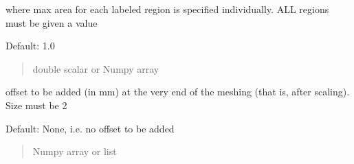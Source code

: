 \documentclass[letterpaper,10pt,english]{sphinxmanual}
\begin{document}
\begin{fulllineitems}
\begin{fulllineitems}
\begin{sphinxVerbatim}[commandchars=\\\{\}]
\PYG{p}{[} \PYG{p}{]}
\PYG{p}{[} \PYG{p}{]}
\end{sphinxVerbatim}

\sphinxAtStartPar
where max area for each labeled region is specified individually. ALL regions must be given a value

\sphinxAtStartPar
Default: 1.0
\begin{quote}\begin{description}
\sphinxAtStartPar
double scalar or Numpy array

\end{description}\end{quote}

\end{fulllineitems}


\begin{fulllineitems}
\label{\detokenize{_autosummary/nirfasterff.utils.MeshingParams2D:nirfasterff.utils.MeshingParams2D.offset}}
\pysigstartsignatures
\pysigline
{}
\pysigstopsignatures
\sphinxAtStartPar
offset to be added (in mm) at the very end of the meshing (that is, after scaling). Size must be 2

\sphinxAtStartPar
Default: None, i.e. no offset to be added
\begin{quote}\begin{description}
\sphinxAtStartPar
Numpy array or list

\end{description}\end{quote}

\end{fulllineitems}


\begin{fulllineitems}
\label{\detokenize{_autosummary/nirfasterff.utils.MeshingParams2D:nirfasterff.utils.MeshingParams2D.__init__}}
\pysigstartsignatures
\pysiglinewithargsret
{}
{\sphinxparamcomma {}\sphinxparamcomma {}}
{}
\pysigstopsignatures
\end{fulllineitems}


\end{fulllineitems}
\end{document}

